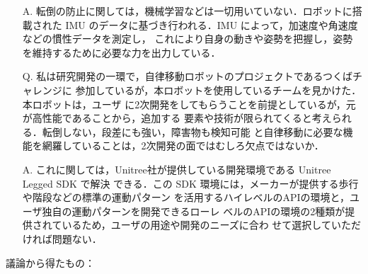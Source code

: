 \documentclass{jsarticle}
\begin{document}
\begin{itemize}
  \item [A.]転倒の防止に関しては，機械学習などは一切用いていない．ロボットに搭載された IMU
  \hspace*{5.5zw}のデータに基づき行われる．IMU によって，加速度や角速度などの慣性データを測定し，
  \hspace*{5.5zw}これにより自身の動きや姿勢を把握し，姿勢を維持するために必要な力を出力している．\\
  \vspace*{1zh}

  \item [Q.]私は研究開発の一環で，自律移動ロボットのプロジェクトであるつくばチャレンジに
  \hspace*{5.5zw}参加しているが，本ロボットを使用しているチームを見かけた．本ロボットは，ユーザ
  \hspace*{5.5zw}に2次開発をしてもらうことを前提としているが，元が高性能であることから，追加する
  \hspace*{5.5zw}要素や技術が限られてくると考えられる．転倒しない，段差にも強い，障害物も検知可能
  \hspace*{5.5zw}と自律移動に必要な機能を網羅していることは，2次開発の面ではむしろ欠点ではないか．
  
  \newpage

  \vspace*{-10zh}

  \item [A.]これに関しては，Unitree社が提供している開発環境である Unitree Legged SDK で解決
  \hspace*{5.5zw}できる．この SDK 環境には，メーカーが提供する歩行や階段などの標準の運動パターン
  \hspace*{5.5zw}を活用するハイレベルのAPIの環境と，ユーザ独自の運動パターンを開発できるローレ
  \hspace*{5.5zw}ベルのAPIの環境の2種類が提供されているため，ユーザの用途や開発のニーズに合わ
  \hspace*{5.5zw}せて選択していただければ問題ない．\\  
\end{itemize}

\hspace*{4.7zw}議論から得たもの：
\end{document}
